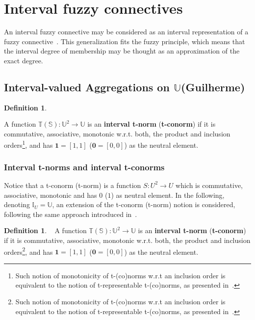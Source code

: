 \documentclass[12pt]{article}
\theoremstyle{plain}
\theoremstyle{remark}
\theoremstyle{definition}
\newtheorem{definition}[theorem]{Definition}
\theoremstyle{proposition}
\newcommand{\II}{\mathbb{I} }
\newcommand{\UU}{\mathbb{U} }
\begin{document}

\section{Interval fuzzy connectives}\label{sec-4}

 An interval fuzzy connective may be considered as an interval representation of a fuzzy connective~\cite{BT06b}. This generalization fits the fuzzy principle, which means that the interval degree of membership may be thought as an approximation of the exact degree.

\subsection{Interval-valued Aggregations on $\UU$(Guilherme)}

\begin{definition}~\cite[Definition 5.1]{BT06b} \label{def-intAggregation}

A function  $\mathbb{T}(\mathbb{S}):\UU^2 \rightarrow \UU$ is an \textbf{interval t-norm}  (\textbf{t-conorm}) if it is commutative, associative, monotonic w.r.t. both, the product and inclusion orders\footnote{Such notion of monotonicity of t-(co)norms w.r.t an inclusion order is equivalent to the notion of t-representable t-(co)norms, as presented in~\cite{Des08}.}, and has $\mathbf{1}=[1,1]$ ($\mathbf{0}=[0,0]$) as the neutral element.
\end{definition}

\subsubsection{Interval t-norms and interval t-conorms}\label{subsec-3b} 
Notice that  a t-conorm (t-norm) is a function $S:U^2 \rightarrow U$ which is commutative,  associative, monotonic and has $0$ ($1$) as neutral element. In the following, denoting $\II_{U}=\mathbb{U}$, an extension of the t-conorm (t-norm) notion is considered, following the same approach introduced in~\cite{BT06b}.

\begin{definition}~\cite[Definition 5.1]{BT06b} \label{def-itnorm}
A function  $\mathbb{T}(\mathbb{S}):\UU^2 \rightarrow \UU$ is an \textbf{interval t-norm}  (\textbf{t-conorm}) if it is commutative, associative, monotonic w.r.t. both, the product and inclusion orders\footnote{Such notion of monotonicity of t-(co)norms w.r.t an inclusion order is equivalent to the notion of t-representable t-(co)norms, as presented in~\cite{Des08}.}, and has $\mathbf{1}=[1,1]$ ($\mathbf{0}=[0,0]$) as the neutral element.
\end{definition}
\end{document}
